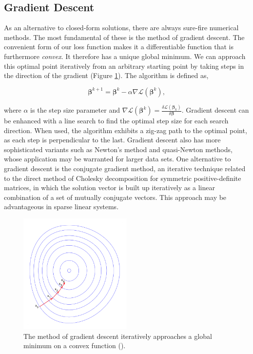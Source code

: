 \documentclass[11pt]{amsart}
\begin{document}
\subsection{Gradient Descent}

As an alternative to closed-form solutions, there are always sure-fire numerical methods. The most fundamental of these is the method of gradient descent. The convenient form of our loss function makes it a differentiable function that is furthermore \emph{convex}. It therefore has a unique global minimum. We can approach this optimal point iteratively from an arbitrary starting point by taking steps in the direction of the gradient (Figure \ref{fig:gradientdescent}). The algorithm is defined as,

$$\boldsymbol\beta^{k+1} = \boldsymbol\beta^{k} - \alpha \nabla\mathcal{L}(\boldsymbol\beta^k),$$

where $\alpha$ is the step size parameter and $\nabla\mathcal{L}(\boldsymbol\beta^k) = \frac{\delta\mathcal{L}(\boldsymbol\beta_k)}{\delta\boldsymbol\beta}$. Gradient descent can be enhanced with a line search to find the optimal step size for each search direction. When used, the algorithm exhibits a zig-zag path to the optimal point, as each step is perpendicular to the last. Gradient descent also has more sophisticated variants such as Newton's method and quasi-Newton methods, whose application may be warranted for larger data sets. One alternative to gradient descent is the conjugate gradient method, an iterative technique related to the direct method of Cholesky decomposition for symmetric positive-definite matrices, in which the solution vector is built up iteratively as a linear combination of a set of mutually conjugate vectors. This approach may be advantageous in sparse linear systems.

\begin{figure}[!ht]
\centering
\includegraphics[width=0.5\textwidth]{Figures/gradientdescent.png}
\caption{The method of gradient descent iteratively approaches a global minimum on a convex function (\cite{gradientdescent}).}
\label{fig:gradientdescent}
\end{figure}
\end{document}

